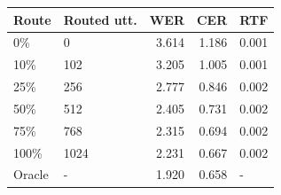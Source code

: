\begin{tabular}{llrrl}
\toprule
Route & Routed utt. & WER & CER & RTF \\
\midrule
0\% & 0 & 3.614 & 1.186 & 0.001 \\
10\% & 102 & 3.205 & 1.005 & 0.001 \\
25\% & 256 & 2.777 & 0.846 & 0.002 \\
50\% & 512 & 2.405 & 0.731 & 0.002 \\
75\% & 768 & 2.315 & 0.694 & 0.002 \\
100\% & 1024 & 2.231 & 0.667 & 0.002 \\
Oracle & - & 1.920 & 0.658 & - \\
\bottomrule
\end{tabular}
